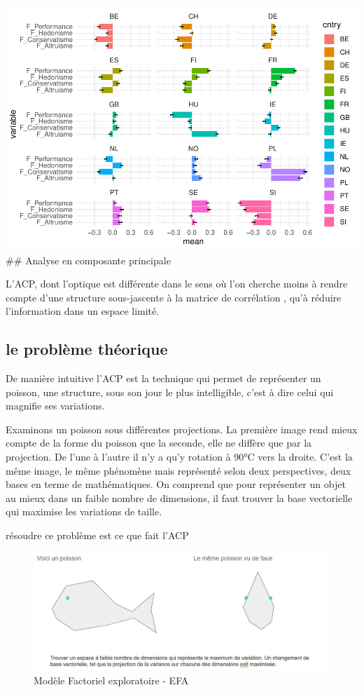 \documentclass[
]{book}
\begin{document}
\includegraphics{bookdown-demo_files/figure-latex/0605-1.pdf}
\#\# Analyse en composante principale

L'ACP, dont l'optique est différente dans le sens où l'on cherche moins à rendre compte d'une structure sous-jascente à la matrice de corrélation , qu'à réduire l'information dans un espace limité.

\hypertarget{le-probluxe8me-thuxe9orique}{%
\subsection{le problème théorique}\label{le-probluxe8me-thuxe9orique}}

De manière intuitive l'ACP est la technique qui permet de représenter un poisson, une structure, sous son jour le plus intelligible, c'est à dire celui qui magnifie ses variations.

Examinons un poisson sous différentes projections. La première image rend mieux compte de la forme du poisson que la seconde, elle ne diffère que par la projection. De l'une à l'autre il n'y a qu'y rotation à 90°C vers la droite. C'est la même image, le même phénomène mais représenté selon deux perspectives, deux bases en terme de mathématiques. On comprend que pour représenter un objet au mieux dans un faible nombre de dimensions, il faut trouver la base vectorielle qui maximise les variations de taille.

résoudre ce problème est ce que fait l'ACP

\begin{figure}
\centering
\includegraphics{./Images/ACp_poisson.jpg}
\caption{Modèle Factoriel exploratoire - EFA}
\end{figure}
\end{document}
